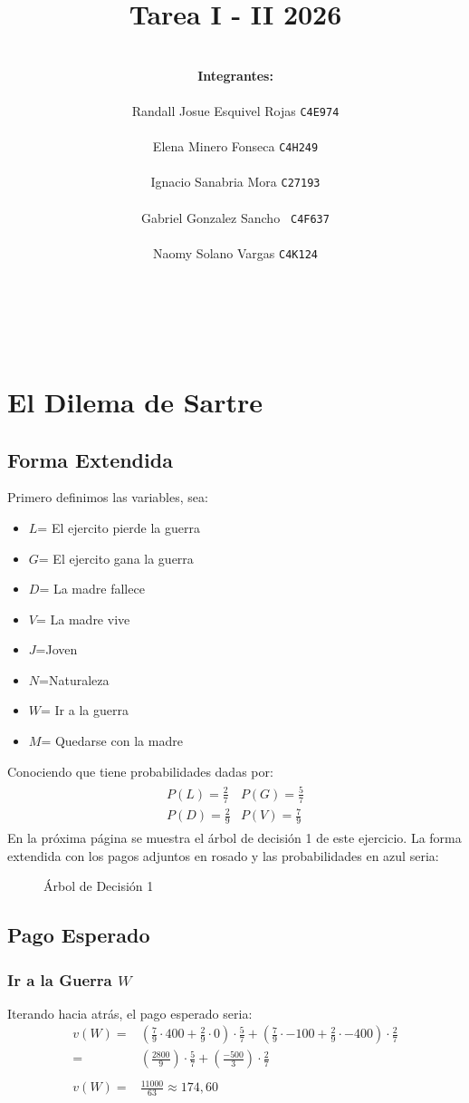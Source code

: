 \documentclass[12pt]{article}
\title{Tarea I - II 2026}
\author{
    \\ \textbf{Integrantes:}\\\\
    Randall Josue Esquivel Rojas \texttt{C4E974} \\\\
    Elena Minero Fonseca \texttt{C4H249} \\\\
    Ignacio Sanabria Mora \texttt{C27193}\\\\
    Gabriel Gonzalez Sancho  \texttt{ C4F637} \\\\
    Naomy Solano Vargas  \texttt{C4K124}\\\\\\\\\\
}
\begin{document}
    \maketitle
\newpage
\section{El Dilema de Sartre}
\subsection{Forma Extendida}
Primero definimos las variables, sea: \\

\begin{itemize}
    \item $L$= El ejercito pierde la guerra 
    \item $G$= El ejercito gana la guerra 
    \item $D$= La madre fallece 
    \item $V$= La madre vive
    \item $J$=Joven
    \item $N$=Naturaleza
    \item $W$= Ir a la guerra
    \item $M$= Quedarse con la madre 
\end{itemize}
Conociendo que tiene probabilidades dadas por: \\
\begin{align*}
    \begin{array}{cc}
        P(L)=\frac{2}{7}  &  P(G)=\frac{5}{7}\\
        P(D)=\frac{2}{9} & P(V)=\frac{7}{9}
    \end{array}
\end{align*}
En la próxima página se muestra el árbol de decisión 1 de este ejercicio. 
\newpage
La forma extendida con los pagos adjuntos en rosado y las probabilidades en azul seria: 
\begin{figure} [H]
    \centering
    
    \caption{Árbol de Decisión 1}
    \label{fig:placeholder}
\end{figure}
\subsection{Pago Esperado}
\subsubsection{Ir a la Guerra $W$}
Iterando hacia atrás, el pago esperado seria: 
\begin{align*}
    v(W)=&(\frac{7}{9}\cdot400+\frac{2}{9}\cdot0)\cdot \frac{5}{7}+(\frac{7}{9}\cdot-100+\frac{2}{9}\cdot -400)\cdot \frac{2}{7}\\
    =&(\frac{2800}{9})\cdot \frac{5}{7}+(\frac{-500}{3})\cdot \frac{2}{7}\\\\
   v(W) =& \frac{11000}{63} \approx 174,60
\end{align*}
\end{document}
